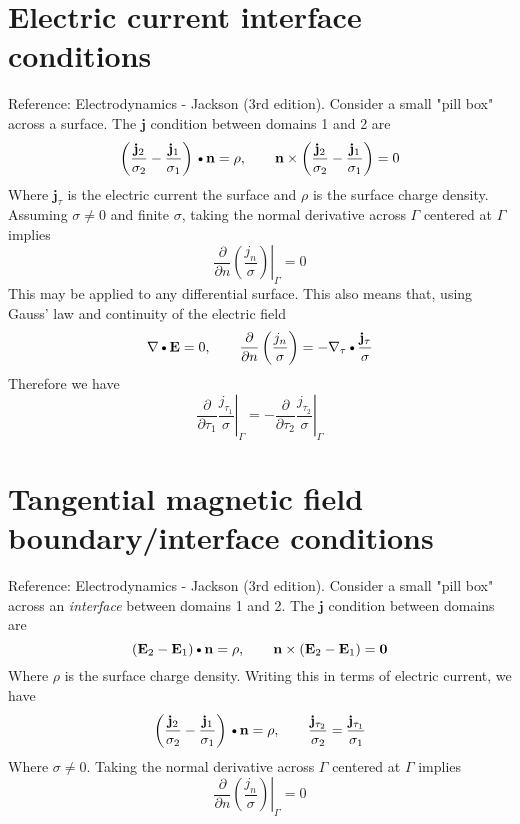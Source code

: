 \documentclass[11pt]{article}
\newcommand{\PD}{\partial}
\newcommand{\J}{\mathbf{j}}
\newcommand{\E}{\mathbf{E}}
\newcommand{\N}{\mathbf{n}}
\newcommand{\DOT}{\text{\textbullet}}
\begin{document}
\section{Electric current interface conditions}
Reference: Electrodynamics - Jackson (3rd edition). Consider a small "pill box" across a surface. The $\J$ condition between domains 1 and 2 are
\begin{equation}
  \left( \frac{\J_2}{\sigma_2} - \frac{\J_1}{\sigma_1} \right) \DOT \N = \rho
  , \qquad
  \N \times \left( \frac{\J_2}{\sigma_2} - \frac{\J_1}{\sigma_1} \right) = 0
\end{equation}
Where $\J_{\tau}$ is the electric current the surface and $\rho$ is the surface charge density. Assuming $\sigma \ne 0$ and finite $\sigma$, taking the normal derivative across $\Gamma$ centered at $\Gamma$ implies
\begin{equation}
  \boxed{
  \left. \frac{\PD}{\PD n} \left(\frac{j_n}{\sigma} \right) \right|_{\Gamma} = 0
  }
\end{equation}
This may be applied to any differential surface. This also means that, using Gauss' law and continuity of the electric field
\begin{equation}
    \nabla \DOT \E = 0
    , \qquad
    \frac{\PD}{\PD n} \left(\frac{j_n}{\sigma} \right) = - \nabla_{\tau} \DOT \frac{\J_{\tau}}{\sigma}
\end{equation}
Therefore we have
\begin{equation}
  \boxed{
  \left. \frac{\PD}{\PD \tau_1} \frac{j_{\tau_1}}{\sigma} \right|_{\Gamma} = - 
  \left. \frac{\PD}{\PD \tau_2} \frac{j_{\tau_2}}{\sigma} \right|_{\Gamma}
  }
\end{equation}


\section{Tangential magnetic field boundary/interface conditions}
Reference: Electrodynamics - Jackson (3rd edition). Consider a small "pill box" across an \textit{interface} between domains 1 and 2. The $\J$ condition between domains are
\begin{equation}
    (\E_2 - \E_1) \DOT \N = \rho
    , \qquad
    \N \times (\E_2 - \E_1) = \mathbf{0}
\end{equation}
Where $\rho$ is the surface charge density. Writing this in terms of electric current, we have
\begin{equation}
    \left( \frac{\J_2}{\sigma_2} - \frac{\J_1}{\sigma_1} \right) \DOT \N = \rho
    , \qquad
    \frac{\J_{\tau_2}}{\sigma_2} = \frac{\J_{\tau_1}}{\sigma_1}
\end{equation}
Where $\sigma \ne 0$. Taking the normal derivative across $\Gamma$ centered at $\Gamma$ implies
\begin{equation}
  \left. \frac{\PD}{\PD n} \left( \frac{j_n}{\sigma} \right) \right|_{\Gamma} = 0
\end{equation}
\end{document}
